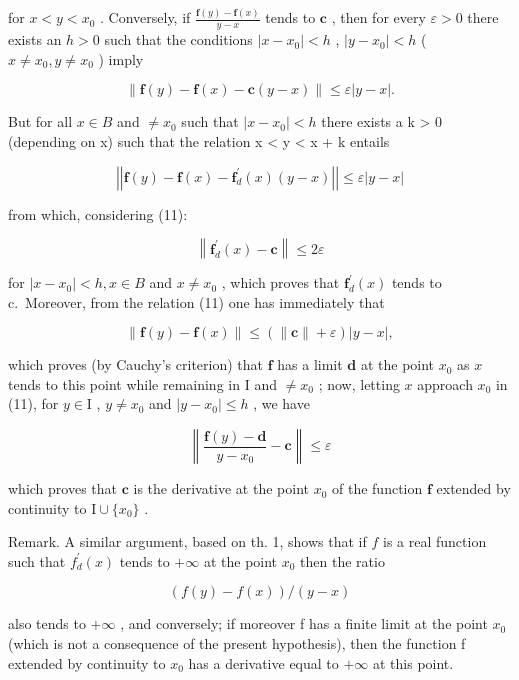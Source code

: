 for \(x < y < x_0\) . Conversely, if \(\frac{\mathbf{f}(y) - \mathbf{f}(x)}{y - x}\) tends to \(\mathbf{c}\) , then for every \(\varepsilon > 0\) there exists an \(h > 0\) such that the conditions \(|x - x_0| < h\) , \(|y - x_0| < h\) ( \(x \neq x_0, y \neq x_0\) ) imply

\[
\left\| \mathbf {f} (y) - \mathbf {f} (x) - \mathbf {c} (y - x) \right\| \leqslant \varepsilon | y - x |.\tag{11}
\]

But for all \(x \in B\) and \(\neq x_{0}\) such that \(|x - x_{0}| < h\) there exists a k \textgreater{} 0 (depending on x) such that the relation x \textless{} y \textless{} x + k entails

\[
\left| \left| \mathbf {f} (y) - \mathbf {f} (x) - \mathbf {f} _ {d} ^ {\prime} (x) (y - x) \right| \right| \leqslant \varepsilon | y - x |\tag{12}
\]

from which, considering (11):

\[
\left\| \mathbf {f} _ {d} ^ {\prime} (x) - \mathbf {c} \right\| \leqslant 2 \varepsilon
\]

for \(|x - x_{0}| < h, x \in B\) and \(x \neq x_{0}\) , which proves that \(\mathbf{f}_{d}^{\prime}(x)\) tends to c.~Moreover, from the relation (11) one has immediately that

\[
\left\| \mathbf {f} (y) - \mathbf {f} (x) \right\| \leqslant \left(\left\| \mathbf {c} \right\| + \varepsilon\right) | y - x |,
\]

which proves (by Cauchy's criterion) that \(\mathbf{f}\) has a limit \(\mathbf{d}\) at the point \(x_0\) as \(x\) tends to this point while remaining in \(\mathrm{I}\) and \(\neq x_0\) ; now, letting \(x\) approach \(x_0\) in (11), for \(y \in \mathrm{I}\) , \(y \neq x_0\) and \(|y - x_0| \leqslant h\) , we have

\[
\left\| \frac {\mathbf {f} (y) - \mathbf {d}}{y - x _ {0}} - \mathbf {c} \right\| \leqslant \varepsilon
\]

which proves that \(\mathbf{c}\) is the derivative at the point \(x_0\) of the function \(\mathbf{f}\) extended by continuity to \(\mathrm{I} \cup \{x_0\}\) .

Remark. A similar argument, based on th. 1, shows that if \(f\) is a real function such that \(f_{d}^{\prime}(x)\) tends to \(+\infty\) at the point \(x_0\) then the ratio

\[
(f (y) - f (x)) / (y - x)
\]

also tends to \(+\infty\) , and conversely; if moreover f has a finite limit at the point \(x_{0}\) (which is not a consequence of the present hypothesis), then the function f extended by continuity to \(x_{0}\) has a derivative equal to \(+\infty\) at this point.

